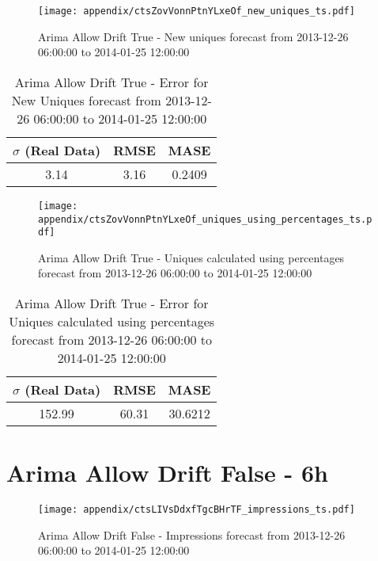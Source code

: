 \begin{figure}[H] \begin{center} \leavevmode
\texttt{[image: appendix/ctsZovVonnPtnYLxeOf\_new\_uniques\_ts.pdf]} \caption{
Arima Allow Drift True - New uniques forecast from 2013-12-26 06:00:00 to 2014-01-25 12:00:00} \label{fig:appendix/ctsZovVonnPtnYLxeOf_new_uniques_ts.pdf} \end{center}
\end{figure}

\begin{table}[H]
\centering
\footnotesize
\begin{tabular}{ccc}
$\sigma$ (Real Data) & RMSE & MASE   \\ \hline
3.14 & 3.16 & 0.2409 \\
\end{tabular}

\vspace{0.5cm}

\caption{
Arima Allow Drift True - Error for New Uniques forecast from 2013-12-26 06:00:00 to 2014-01-25 12:00:00}
\end{table}

\begin{figure}[H] \begin{center} \leavevmode
\texttt{[image: appendix/ctsZovVonnPtnYLxeOf\_uniques\_using\_percentages\_ts.pdf]} \caption{
Arima Allow Drift True - Uniques calculated using percentages forecast from 2013-12-26 06:00:00 to 2014-01-25 12:00:00} \label{fig:appendix/ctsZovVonnPtnYLxeOf_uniques_using_percentages_ts.pdf} \end{center}
\end{figure}

\begin{table}[H]
\centering
\footnotesize
\begin{tabular}{ccc}
$\sigma$ (Real Data) & RMSE & MASE   \\ \hline
152.99 & 60.31 & 30.6212 \\
\end{tabular}

\vspace{0.5cm}

\caption{
Arima Allow Drift True - Error for Uniques calculated using percentages forecast from 2013-12-26 06:00:00 to 2014-01-25 12:00:00}
\end{table}

\section{Arima Allow Drift False - 6h}
\begin{figure}[H] \begin{center} \leavevmode
\texttt{[image: appendix/ctsLIVsDdxfTgcBHrTF\_impressions\_ts.pdf]} \caption{
Arima Allow Drift False - Impressions forecast from 2013-12-26 06:00:00 to 2014-01-25 12:00:00} \label{fig:appendix/ctsLIVsDdxfTgcBHrTF_impressions_ts.pdf} \end{center}
\end{figure}

